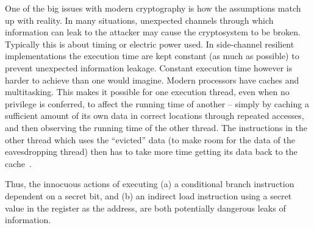 
One of the big issues with modern cryptography is how the assumptions
match up with reality. In many situations, unexpected channels
through which information can leak to the attacker may cause the
cryptosystem to be broken. Typically this is about timing or
electric power used. 
In side-channel resilient implementations the execution time
are kept constant (as much as possible) to prevent unexpected
information leakage.
Constant execution time however is harder to achieve than one would imagine.
Modern processors have caches 
and multitasking. This makes it possible for one execution
thread, even when no privilege is conferred, to affect the running
time of another -- simply by caching a sufficient amount of its own
data in correct locations through repeated accesses, and then
observing the running time of the other thread. The instructions in
the other thread which uses the ``evicted'' data (to make room for the
data of the eavesdropping thread) then has to take more time getting
its data back to the cache~\cite{B:05:CTAA}. 

Thus, the innocuous actions of executing (a) a conditional
branch instruction dependent on a secret bit, and (b) an
indirect load instruction using a secret value in the register as the
address, are both potentially dangerous leaks of information.


